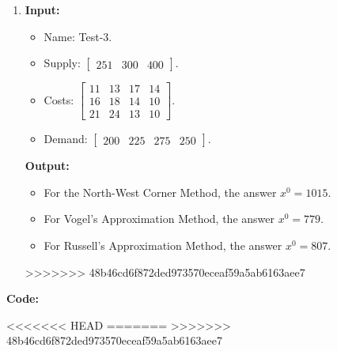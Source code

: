 \documentclass{article}
\begin{document}
\begin{enumerate}[label={(\arabic*)}, itemsep=0.25in]
    \item \textbf{Input:}
          \begin{itemize}
              \item Name: Test-3.
              \item Supply: \(\begin{bmatrix} 251 & 300 & 400 \end{bmatrix}\).
              \item Costs: \(\begin{bmatrix}
                        11 & 13 & 17 & 14 \\
                        16 & 18 & 14 & 10 \\
                        21 & 24 & 13 & 10
                    \end{bmatrix}\).
              \item Demand: \(\begin{bmatrix} 200 & 225 & 275 & 250 \end{bmatrix}\).
          \end{itemize}
          \textbf{Output:}
          \begin{itemize}
              \item For the North-West Corner Method, the answer \(x^0 = \num{1015}\).
              \item For Vogel's Approximation Method, the answer \(x^0 = \num{779}\).
              \item For Russell's Approximation Method, the answer \(x^0 = \num{807}\).
          \end{itemize}
>>>>>>> 48b46cd6f872ded973570eceaf59a5ab6163aee7
\end{enumerate}

\newpage

\textbf{Code:}


\newpage


\newpage

<<<<<<< HEAD
=======
>>>>>>> 48b46cd6f872ded973570eceaf59a5ab6163aee7

\newpage


\newpage

\end{document}
